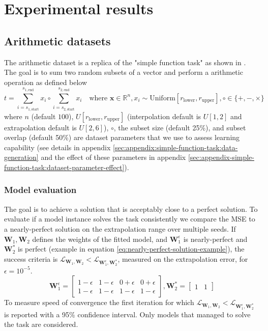 \section{Experimental results}
\label{sec:experiments}

\subsection{Arithmetic datasets}
\label{sec:arithmetic-dataset}

The arithmetic dataset is a replica of the "simple function task" as shown in \cite{trask-nalu}.
The goal is to sum two random subsets of a vector and perform a arithmetic operation as defined below
\begin{equation}
t = \sum_{i = s_{1,\mathrm{start}}}^{s_{1,\mathrm{end}}} x_i \circ \sum_{i = s_{2,\mathrm{start}}}^{s_{2,\mathrm{end}}} x_i \quad \text{where } \mathbf{x} \in \mathbb{R}^n, x_i \sim \mathrm{Uniform}[r_{\mathrm{lower}}, r_{\mathrm{upper}}], \circ \in \{+, -, \times\}
\label{eq:arithmetic-problem}
\end{equation}
where $n$ (default $100$), $U[r_{\mathrm{lower}}, r_{\mathrm{upper}}]$ (interpolation default is $U[1,2]$ and extrapolation default is $U[2,6]$), $\circ$, the subset size (default 25\%), and subset overlap (default 50\%) are dataset parameters that we use to assess learning capability (see details in appendix \ref{sec:appendix:simple-function-task:data-generation} and the effect of these parameters in appendix \ref{sec:appendix-simple-function-task:dataset-parameter-effect}).

\subsubsection{Model evaluation}
The goal is to achieve a solution that is acceptably close to a perfect solution. To evaluate if a model instance solves the task consistently we compare the MSE to a nearly-perfect solution on the extrapolation range over multiple seeds. If $\mathbf{W}_1, \mathbf{W}_2$ defines the weights of the fitted model, and $\mathbf{W}_1^\epsilon$ is nearly-perfect and $\mathbf{W}_2^*$ is perfect (example in equation \ref{eq:nearly-perfect-solution-example}), the success criteria is $\mathcal{L}_{\mathbf{W}_1, \mathbf{W}_2} < \mathcal{L}_{\mathbf{W}_1^\epsilon, \mathbf{W}_2^*}$, measured on the extrapolation error, for $\epsilon = 10^{-5}$.
\begin{equation}
    \mathbf{W}_1^\epsilon = \begin{bmatrix}
    1 - \epsilon & 1 - \epsilon & 0 + \epsilon & 0 + \epsilon \\
    1 - \epsilon & 1 - \epsilon & 1 - \epsilon & 1 - \epsilon
    \end{bmatrix}, \mathbf{W}_2^* = \begin{bmatrix}
    1 & 1
    \end{bmatrix}
    \label{eq:nearly-perfect-solution-example}
\end{equation}
To measure speed of convergence the first iteration for which $\mathcal{L}_{\mathbf{W}_1, \mathbf{W}_2} < \mathcal{L}_{\mathbf{W}_1^\epsilon, \mathbf{W}_2^*}$ is reported with a 95\% confidence interval. Only models that managed to solve the task are considered.

